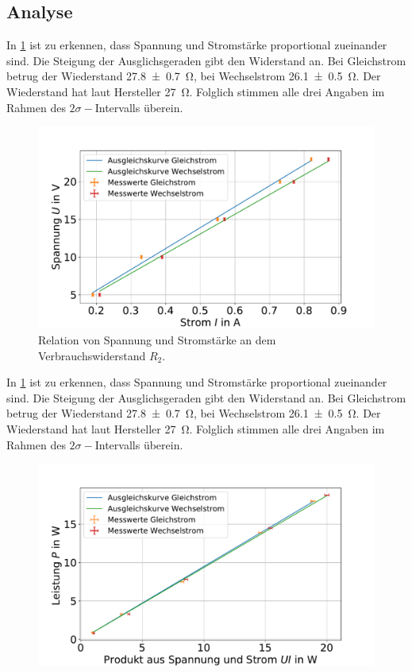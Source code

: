 \subsection{Analyse} 

In \cref{fig:widerstand-r2} ist zu erkennen, dass Spannung und Stromstärke proportional zueinander sind. Die Steigung der Ausglichsgeraden gibt den Widerstand an. Bei Gleichstrom betrug der Wiederstand \SI{27.8+-0.7}{\ohm}, bei Wechselstrom \SI{26.1+- 0.5}{\ohm}. Der Wiederstand hat laut Hersteller \SI{27}{\ohm}. Folglich stimmen alle drei Angaben im Rahmen des $2\sigma-$Intervalls überein.


\begin{figure}[h]
	\centering
	\includegraphics[width=0.9\linewidth]{"auswertung/Auswertung Innenwiderstand/Widerstand R2 B"}
	\caption{Relation von Spannung und Stromstärke an dem Verbrauchswiderstand $R_2$.}
	\label{fig:widerstand-r2}
\end{figure}


In \cref{fig:widerstand-r2} ist zu erkennen, dass Spannung und Stromstärke proportional zueinander sind. Die Steigung der Ausglichsgeraden gibt den Widerstand an. Bei Gleichstrom betrug der Wiederstand \SI{27.8+-0.7}{\ohm}, bei Wechselstrom \SI{26.1+- 0.5}{\ohm}. Der Wiederstand hat laut Hersteller \SI{27}{\ohm}. Folglich stimmen alle drei Angaben im Rahmen des $2\sigma-$Intervalls überein.





\begin{figure}
	\centering
	\includegraphics[width=0.9\linewidth]{"auswertung/Auswertung Innenwiderstand/Leistung 2"}
	\caption{}
	\label{fig:leistung-r2}
\end{figure}
